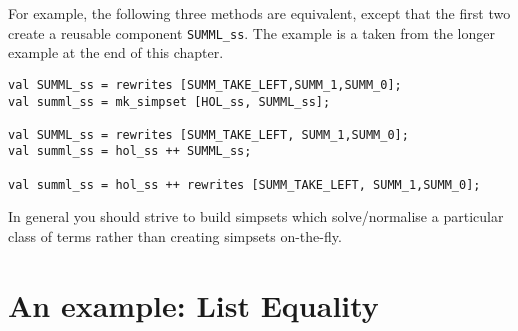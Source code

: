 For example, the following three methods are equivalent, except that the
first two create a reusable component {\tt SUMML\_ss}.  The example is a
taken from the longer example at the end of this chapter.
\begin{verbatim}
val SUMML_ss = rewrites [SUMM_TAKE_LEFT,SUMM_1,SUMM_0]; 
val summl_ss = mk_simpset [HOL_ss, SUMML_ss];

val SUMML_ss = rewrites [SUMM_TAKE_LEFT, SUMM_1,SUMM_0];
val summl_ss = hol_ss ++ SUMML_ss;

val summl_ss = hol_ss ++ rewrites [SUMM_TAKE_LEFT, SUMM_1,SUMM_0];
\end{verbatim}
In general you should strive to build simpsets which solve/normalise a
particular class of terms rather than creating simpsets on-the-fly.

\section{An example: List Equality}

